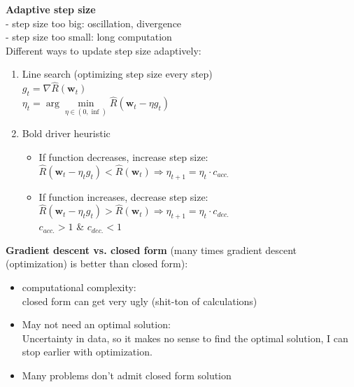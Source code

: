 \documentclass[a4paper, fontsize=8pt, landscape, DIV=1]{scrartcl}
\begin{document}
\begin{multicols*}{4}
		\textbf{Adaptive step size}\\
		- step size too big: oscillation, divergence\\
		- step size too small: long computation\\
		Different ways to update step size adaptively: 
		\begin{enumerate}[noitemsep]
			\item Line search (optimizing step size every step)\\
			$g_t=\nabla\hat{R}(\textbf{w}_t)$\\
			$\eta_t = \arg \min\limits_{\eta\in(0,\inf)}\hat{R}(\textbf{w}_t-\eta g_t)$
			\item Bold driver heuristic
			\begin{itemize}
				\item If function decreases, increase step size:\\
				$\hat{R}(\textbf{w}_t-\eta_t g_t)<\hat{R}(\textbf{w}_t)\Rightarrow \eta_{t+1}=\eta_t\cdot c_{acc.}$ 
				\item If function increases, decrease step size:\\
				$\hat{R}(\textbf{w}_t-\eta_t g_t)>\hat{R}(\textbf{w}_t)\Rightarrow \eta_{t+1}=\eta_t\cdot c_{dec.}$\\
				$c_{acc.}>1$ \& $c_{dec.}<1$
			\end{itemize}
		\end{enumerate}
		\textbf{Gradient descent vs. closed form} (many times gradient descent (optimization) is better than closed form):
		\vspace{-0.2cm} 
		\begin{itemize}[noitemsep]
			\item computational complexity:\\
			closed form can get very ugly (shit-ton of calculations)
			\item May not need an optimal solution:\\
			Uncertainty in data, so it makes no sense to find the optimal solution, I can stop earlier with optimization.
			\item Many problems don't admit closed form solution
		\end{itemize}
		\columnbreak
		

\end{multicols*}
\end{document}
